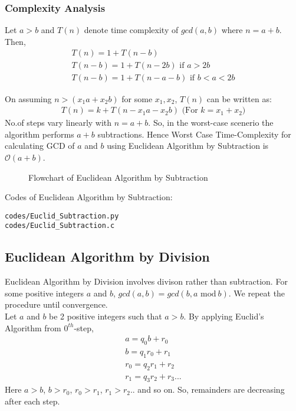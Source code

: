 \documentclass[journal,12pt,twocolumn]{IEEEtran}
\begin{document}
\subsubsection{Complexity Analysis}
Let $a > b$ and $T(n)$ denote time complexity of $gcd(a,b)$ where $n = a+b$. Then,
\begin{align}
T(n) = 1 + T(n-b)\\
T(n-b) = 1 + T(n-2b) \text{ if $a > 2b$}\\
T(n-b) = 1 + T(n-a-b) \text{ if $b < a < 2b$}
\end{align}

On assuming $n > (x_{1}a + x_{2}b)$ for some $x_{1}, x_{2}$, $T(n)$ can be written as:
\begin{align}
T(n) = k + T(n - x_{1}a - x_{2}b) \text{ (For $k = x_{1} + x_{2}$)}
\end{align}
No.of steps vary linearly with $n=a+b$. So, in the worst-case scenerio the algorithm performs $a+b$ subtractions. Hence Worst Case Time-Complexity for calculating GCD of $a$ and  $b$ using Euclidean Algorithm by Subtraction is $\mathcal{O}(a + b)$.\\

\begin{figure}[h!]
	\begin{center}
		\resizebox{\columnwidth/1}{!}{}
	\end{center}
	\caption{Flowchart of Euclidean Algorithm by Subtraction}
	\label{fig:Input}
\end{figure}

Codes of Euclidean Algorithm by Subtraction:
\begin{lstlisting}
codes/Euclid_Subtraction.py
codes/Euclid_Subtraction.c
\end{lstlisting}

\subsection{Euclidean Algorithm by Division}
Euclidean Algorithm by Division involves divison rather than subtraction. For some positive integers $a$ and $b$, $gcd(a, b) = gcd(b, a \textrm{ mod}\ b)$. We repeat the procedure until convergence.\\

Let $a$ and $b$ be 2 positive integers such that $a > b$. By applying Euclid's Algorithm from $0^{th}$-step,\\
\begin{align}
	a = q_{0}b + r_{0}\label{eq:ED1}\\
	b = q_{1}r_{0} + r_{1}\\
	r_{0} = q_{2}r_{1} + r_{2}\\
	r_{1} = q_{3}r_{2} + r_{3}...
\end{align}
Here $a > b$, $ b > r_{0}$, $r_{0} > r_{1}$, $r_{1} > r_{2}$.. and so on. So, remainders are decreasing after each step.
\end{document}
